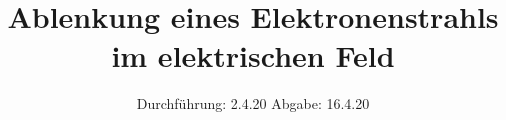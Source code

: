 

\subject{V501}
\title{Ablenkung eines Elektronenstrahls im elektrischen Feld}
\date{%
  Durchführung: 2.4.20
  \hspace{3em}
  Abgabe: 16.4.20
}



\maketitle
\thispagestyle{empty}
\tableofcontents
\newpage







\printbibliography{}


